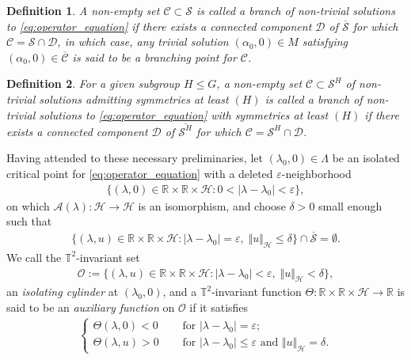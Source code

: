 \documentclass[11pt]{amsart}
\def\br{{\mathbb{R}}}
\def\bt{{\mathbb{T}}}
\def\br{\mathbb R}
\newtheorem{definition}{Definition}[section]
\begin{document}
\begin{definition} \rm
A non-empty set $\mathcal C \subset \mathscr S$ is called a {\it branch} of non-trivial solutions to \eqref{eq:operator_equation} if there exists a connected component $\mathcal D$ of $\overline{\mathscr S}$ for which $\mathcal C = \mathscr S \cap \mathcal D$, in which case, any trivial solution $(\alpha_0,0)  \in M$ satisfying $(\alpha_0,0) \in \overline{\mathcal C}$ is said to be a branching point for $\mathcal C$. 
\end{definition}
\begin{definition}  \rm
For a given subgroup $H \leq G$, a non-empty set $\mathcal C \subset \mathscr S^H$ of non-trivial solutions admitting symmetries at least $(H)$ is called {\it a branch of non-trivial solutions to \eqref{eq:operator_equation} with symmetries at least $(H)$} if there exists a connected component $\mathcal D$ of $\overline{\mathscr S^H}$ for which $\mathcal C = \mathscr S^H \cap \mathcal D$.
\end{definition}
Having attended to these necessary preliminaries, let $(\lambda_0,0) \in \Lambda$ be an isolated critical point for \eqref{eq:operator_equation} with a deleted $\varepsilon$-neighborhood 
\begin{align} \label{def:deleted_epsilon_regular_nbhd}
\{ (\lambda,0) \in \br \times \br \times \mathscr H : 0 < \vert \lambda - \lambda_0 \vert < \varepsilon \},    
\end{align}
on which $\mathscr A(\lambda) : \mathscr H \rightarrow \mathscr H$ is an isomorphism, and choose $\delta > 0$ small enough such that
\begin{align} \label{eq:lbi_admissibility_condition}
\{ (\lambda,u) \in \br \times \br \times \mathscr H : | \lambda - \lambda_0 | = \varepsilon, \; \Vert u \Vert_{\mathscr H} \leq \delta \} \cap \overline{\mathscr S} = \emptyset.    
\end{align}
We call the $\bt^2$-invariant set
\begin{align} \label{def:isolating_cylinder}
 \mathscr O := \{ (\lambda,u) \in \br \times \br \times \mathscr H : | \lambda - \lambda_0 | < \varepsilon, \; \Vert u \Vert_{\mathscr H} < \delta \},   
\end{align}
an {\it isolating cylinder} at $(\lambda_0,0)$, and 
a $\bt^2$-invariant function $\Theta: \br \times \br \times \mathscr H \rightarrow \br$ is said to be an {\it auxiliary function} on $\mathscr O$ if it satisfies
\begin{align} \label{def:auxiliary_function_conditions}
   \begin{cases}
\Theta(\lambda,0) < 0 \quad & \text{ for } |\lambda - \lambda_0 | = \varepsilon; \\
\Theta(\lambda,u) > 0  \quad & \text{ for } |\lambda - \lambda_0 | \leq \varepsilon \text{ and } \Vert u \Vert_{\mathscr H} = \delta.
\end{cases}    
\end{align}
\end{document}
